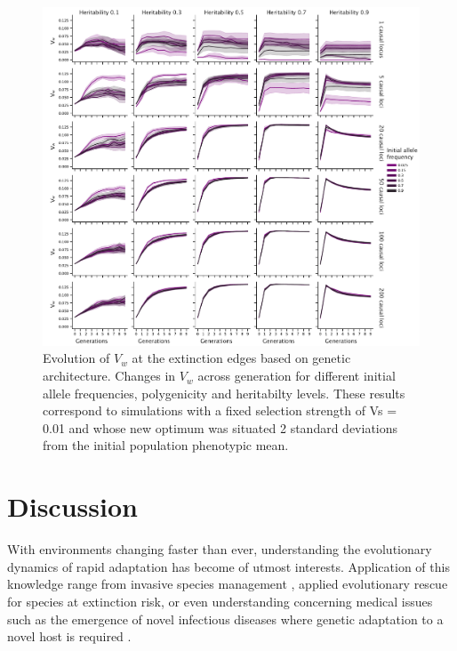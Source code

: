 \documentclass{article}
\begin{document}
\begin{figure}[H]
    \centering
    \includegraphics[width=1\textwidth]{figures/var_fitness_across_gen.pdf}
    \caption{Evolution of $V_w$ at the extinction edges based on genetic architecture. Changes in $V_w$ across generation for different initial allele frequencies, polygenicity and heritabilty levels. These results correspond to simulations with a fixed selection strength of Vs = 0.01 and whose new optimum was situated 2 standard deviations from the initial population phenotypic mean.}
    \label{fig:var_fitness_across_gen}
\end{figure}

\section{Discussion}
With environments changing faster than ever, understanding the evolutionary dynamics of rapid adaptation has become of utmost interests. Application of this knowledge range from invasive species management \citep{Lee2002-jg, Lee2008-cd}, applied evolutionary rescue for species at extinction risk, or even understanding concerning medical issues such as the emergence of novel infectious diseases where genetic adaptation to a novel host is required \citep{Holt2002-fn, Antia2003-in}.
\end{document}
